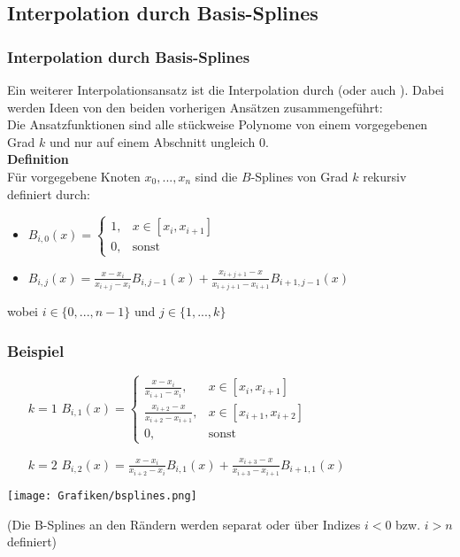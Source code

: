 \subsection{Interpolation durch Basis-Splines}
\makeSectionDividerPage
%
%
\begin{frame}\frametitle{Interpolation durch Basis-Splines}	
Ein weiterer Interpolationsansatz ist die Interpolation durch  (oder auch ). Dabei werden Ideen von den beiden vorherigen Ansätzen zusammengeführt:\\
Die Ansatzfunktionen sind alle stückweise Polynome von einem vorgegebenen Grad $k$ und nur auf einem Abschnitt ungleich $0$.\\\pause\vfill
\textbf{Definition}\\
Für vorgegebene Knoten $x_0,...,x_n$ sind die $B$-Splines von Grad $k$ rekursiv definiert durch:
\begin{itemize}
\item $B_{i,0}(x)=\begin{cases}1, & x\in [x_i,x_{i+1}]\\ 0 ,& \text{sonst} \end{cases}$
\item $B_{i,j}(x)=\frac{x-x_i}{x_{i+j}-x_i}B_{i,j-1}(x)+\frac{x_{i+j+1}-x}{x_{i+j+1}-x_{i+1}}B_{i+1,j-1}(x)$
\end{itemize}
wobei $i\in\{0,...,n-1\}$ und $j\in \{1,...,k\}$
\end{frame}
%
\begin{frame}\frametitle{Beispiel}
\begin{itemize}
\item[$k=1$] $B_{i,1}(x)=\begin{cases} \frac{x-x_i}{x_{i+1}-x_i}, & x \in [x_i,x_{i+1}]\\  \frac{x_{i+2}-x}{x_{i+2}-x_{i+1}}, & x \in [x_{i+1},x_{i+2}]\\ 0, & \text{sonst}\end{cases}$

\item[$k=2$] $B_{i,2}(x)=\frac{x-x_i}{x_{i+2}-x_i}B_{i,1}(x)+\frac{x_{i+3}-x}{x_{i+3}-x_{i+1}}B_{i+1,1}(x)$
\end{itemize}
\begin{center}
\texttt{[image: Grafiken/bsplines.png]}
\end{center}	
\small
(Die B-Splines an den Rändern werden separat oder über Indizes $i<0$ bzw. $i>n$ definiert)
\end{frame}
%
